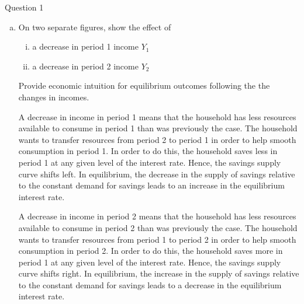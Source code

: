\documentclass[a4paper]{article}
\begin{document}
\begin{questionbox}{Question 1}
\begin{enumerate}[(a)]
\begin{explanationbox}
\begin{figure}[H]
				\end{figure}
			\end{explanationbox}
			\item On two separate figures, show the effect of 
			\begin{enumerate}[(i)]
				\item a decrease in period 1 income \( Y_1 \)
				\item a decrease in period 2 income \( Y_2 \)
			\end{enumerate}
			Provide economic intuition for equilibrium outcomes following the the changes in incomes.
			\begin{explanationbox}
				A decrease in income in period 1 means that the household has less resources available to consume in period 1 than was previously the case. The household wants to transfer resources from period 2 to period 1 in order to help smooth consumption in period 1. In order to do this, the household saves less in period 1 at any given level of the interest rate. Hence, the savings supply curve shifts left. In equilibrium, the decrease in the supply of savings relative to the constant demand for savings leads to an increase in the equilibrium interest rate.
				\begin{figure}[H]
					\centering
				\end{figure}
				A decrease in income in period 2 means that the household has less resources available to consume in period 2 than was previously the case. The household wants to transfer resources from period 1 to period 2 in order to help smooth consumption in period 2. In order to do this, the household saves more in period 1 at any given level of the interest rate. Hence, the savings supply curve shifts right. In equilibrium, the increase in the supply of savings relative to the constant demand for savings leads to a decrease in the equilibrium interest rate.

\end{explanationbox}
\end{enumerate}
\end{questionbox}
\end{document}
